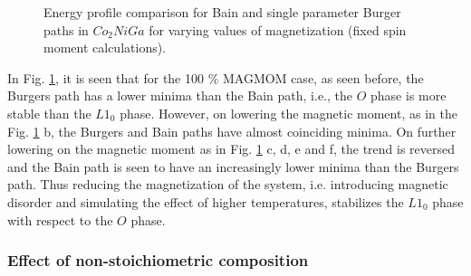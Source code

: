 \documentclass[%
preprint,
 amsmath,amssymb,
 aps,
prb,
showkeys,
]{revtex4-1}
\begin{document}
\begin{figure}[htp!]
\caption{Energy profile comparison for Bain and single parameter Burger  paths in  $Co_2NiGa$  for varying values of magnetization (fixed spin moment calculations). }
\label{magnetic_disorder}
\end{figure}

In Fig. \ref{magnetic_disorder}, it is seen that for the 100 $\%$ MAGMOM case,  as seen before, the Burgers path has a lower minima than the Bain path, i.e., the $O$ phase is more stable than the $L1_0$ phase. However, on lowering the magnetic moment,  as in the Fig. \ref{magnetic_disorder} b, the Burgers and Bain paths have almost coinciding minima. On further lowering on the magnetic moment  as in Fig. \ref{magnetic_disorder} c, d, e and f, the trend is reversed and the Bain path is seen to have an increasingly lower minima than the Burgers path.  Thus reducing the magnetization of the system, i.e. introducing magnetic disorder and simulating the effect of higher temperatures, stabilizes the $L1_0$ phase with respect to the $O$ phase. 
\subsubsection{Effect of non-stoichiometric composition}
\end{document}
